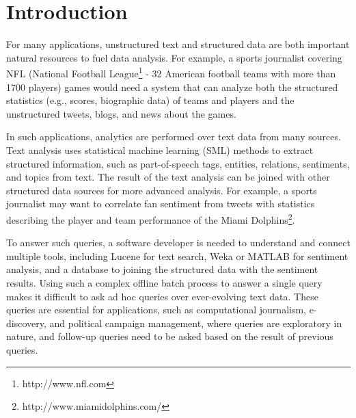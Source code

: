 

\section{Introduction}

For many
applications, unstructured text and structured data are both
important natural resources to fuel data analysis. For example, a
sports journalist covering NFL (National Football
League\footnote{http://www.nfl.com} - 32 American football teams with
more than 1700 players) games would need a system that can analyze both the
structured statistics (e.g., scores, biographic data) of teams and players and the
unstructured tweets, blogs, and news about the games.

In such applications, analytics are performed over text data
from many sources. Text analysis uses 
statistical machine learning (SML) methods to extract structured
information, such as part-of-speech tags, entities, relations, 
sentiments, and topics from
text. The result of the text analysis can be joined with other
structured data sources for more advanced analysis. For example, a sports
journalist may want to correlate fan sentiment from tweets 
with statistics describing the player and team performance
of the Miami Dolphins\footnote{http://www.miamidolphins.com/}.

To answer such queries, a software
developer is needed to understand and connect multiple tools,
including Lucene for text search, Weka or MATLAB for sentiment
analysis, and a database to joining the structured data with the
sentiment results. Using such a complex offline batch process to 
answer a single query
makes it difficult to ask ad hoc queries over ever-evolving text data. 
These queries are essential for applications, such as computational journalism,
e-discovery, and political campaign management, where queries are
exploratory in nature, and follow-up queries need to be asked based
on the result of previous queries.





